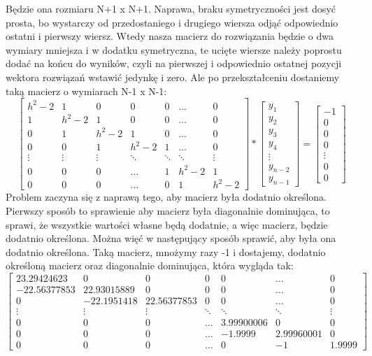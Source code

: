 \documentclass[12pt]{article}
\begin{document}
Będzie ona rozmiaru N+1 x N+1. Naprawa, braku symetryczności jest dosyć prosta, bo wystarczy od przedostaniego i drugiego wiersza odjąć odpowiednio ostatni i pierwszy wiersz. Wtedy nasza macierz do rozwiązania będzie o dwa wymiary mniejsza i w dodatku symetryczna, te ucięte wiersze należy poprostu dodać na końcu do wyników, czyli na pierwszej i odpowiednio ostatnej pozycji wektora rozwiązań wstawić jedynkę i zero. Ale po przekształceniu dostaniemy taką macierz o wymiarach N-1 x N-1:
\[
\begin{bmatrix}
    h^{2}-2 & 1 & 0 & 0 & 0 & \dots & 0\\
    1 & h^{2}-2 & 1 & 0 & 0 & \dots & 0\\ 
    0 & 1 & h^{2}-2 & 1 & 0 & \dots & 0\\
    0 & 0 & 1 & h^{2}-2 & 1 &\dots & 0\\
    \vdots & \vdots & \vdots & \ddots & \ddots & \ddots & \vdots\\
    0 & 0 & 0 & \hdots & 1 & h^{2}-2 & 1\\
    0 & 0 & 0 & \hdots & 0 & 1 & h^{2}-2
\end{bmatrix}
*
\begin{bmatrix}
    y_{1}\\
    y_{2}\\
    y_{3}\\
    y_{4}\\
    \vdots\\
    y_{n-2}\\
    y_{n-1}
\end{bmatrix}
=
\begin{bmatrix}
    -1\\
    0\\
    0\\
    0\\
    \vdots\\
    0\\
    0
\end{bmatrix}
\]
Problem zaczyna się z naprawą tego, aby macierz była dodatnio określona. Pierwszy sposób to sprawienie aby macierz była diagonalnie dominująca, to sprawi, że wszystkie wartości własne będą dodatnie, a więc macierz, będzie dodatnio określona. Można więć w następujący sposób sprawić, aby była ona dodatnio określona. Taką macierz, mnożymy razy -1 i dostajemy, dodatnio określoną macierz oraz diagonalnie dominująca, która wygląda tak: 
\[
\begin{bmatrix}
    23.29424623 & 0 & 0 & 0 & 0 & \dots & 0\\
    -22.56377853 & 22.93015889 & 0 & 0 & 0 & \dots & 0\\ 
    0 & -22.1951418 & 22.56377853 & 0 & 0 & \dots & 0\\
    \vdots & \vdots & \vdots & \ddots & \ddots & \ddots & \vdots\\
    0 & 0 & 0 & \hdots & 3.99900006 & 0 & 0\\
    0 & 0 & 0 & \hdots & -1.9999 & 2.99960001 & 0\\
    0 & 0 & 0 & \hdots & 0 & -1 & 1.9999
\end{bmatrix}
\]
\end{document}
